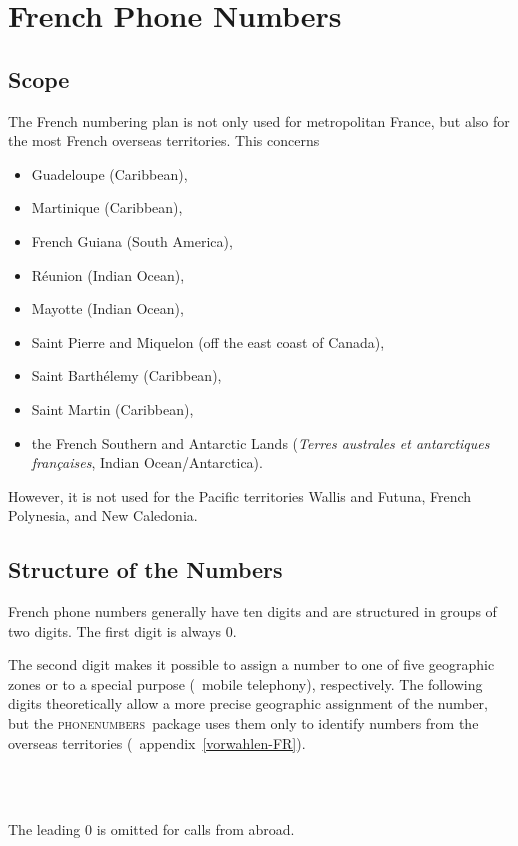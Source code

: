 \documentclass[numbers=noenddot]{scrreprt}
\newcommand*{\Paket}[1]{\textsc{#1}}
\newcommand{\phone}{\textcolor{cnltx}{\Paket{phone\-numbers}}}
\newcommand{\UeberschriftGeltungsbereich}{\section{Scope}}
\newcommand{\UeberschriftAufbau}{\section{Structure of the Numbers}}
\newcommand*{\vglAnhang}[1]{(\cf\ appendix~\ref{#1})}
\begin{document}
\chapter{French Phone Numbers}
\UeberschriftGeltungsbereich \label{FR-bereich}
The French numbering plan
\cite{ARCEP}
is not only used for metropolitan France, but also for the most French overseas territories. This concerns
\begin{itemize}
\item Guadeloupe (Caribbean),
\item Martinique (Caribbean),
\item French Guiana (South America),
\item R\'eunion (Indian Ocean),
\item Mayotte (Indian Ocean),
\item Saint Pierre and Miquelon (off the east coast of Canada),
\item Saint Barth\'elemy (Caribbean),
\item Saint Martin (Caribbean),
\item the French Southern and Antarctic Lands (\emph{\foreignlanguage{french}{Terres australes et antarctiques françaises}}, Indian Ocean/Antarctica).
\end{itemize}
However, it is not used for the Pacific territories Wallis and Futuna, French Polynesia, and New Caledonia.

\UeberschriftAufbau
French phone numbers generally have ten digits and are structured in groups of two digits. The first digit is always 0.
\begin{sidebyside}
\end{sidebyside}
The second digit makes it possible to assign a number to one of five geographic zones or to a special purpose (\eg\ mobile telephony), respectively. The following digits theoretically allow a more precise geographic assignment of the number, but the \phone\ package uses them only to identify numbers from the overseas territories
\vglAnhang{vorwahlen-FR}.
\begin{sidebyside}
   \\
   \\
\end{sidebyside}

The leading 0 is omitted for calls from abroad.
\begin{sidebyside}
\end{sidebyside}
\end{document}
